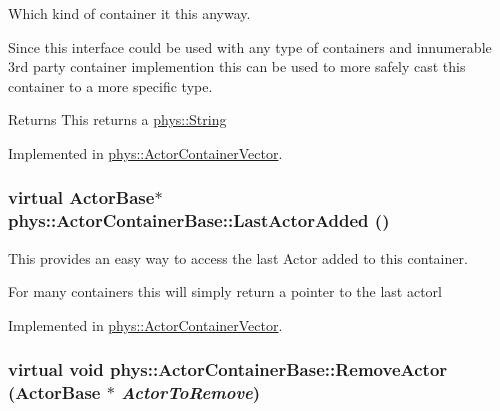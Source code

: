Which kind of container it this anyway. 

Since this interface could be used with any type of containers and innumerable 3rd party container implemention this can be used to more safely cast this container to a more specific type. \begin{DoxyReturn}{Returns}
This returns a \hyperlink{namespacephys_aa03900411993de7fbfec4789bc1d392e}{phys::String} 
\end{DoxyReturn}


Implemented in \hyperlink{classphys_1_1ActorContainerVector_a20d18213e69b3821ee973865df428e6d}{phys::ActorContainerVector}.

\hypertarget{classphys_1_1ActorContainerBase_a6ccc6d058bcbbe0b9a638e28fb136477}{
\subsubsection[{LastActorAdded}]{\setlength{\rightskip}{0pt plus 5cm}virtual {\bf ActorBase}$\ast$ phys::ActorContainerBase::LastActorAdded ()}}
\label{d1/d00/classphys_1_1ActorContainerBase_a6ccc6d058bcbbe0b9a638e28fb136477}


This provides an easy way to access the last Actor added to this container. 

For many containers this will simply return a pointer to the last actorl 

Implemented in \hyperlink{classphys_1_1ActorContainerVector_a49e643bdeff78521de9c4a9fea59a0d2}{phys::ActorContainerVector}.

\hypertarget{classphys_1_1ActorContainerBase_a523072e42f6b581d044432f84a84ede4}{
\subsubsection[{RemoveActor}]{\setlength{\rightskip}{0pt plus 5cm}virtual void phys::ActorContainerBase::RemoveActor ({\bf ActorBase} $\ast$ {\em ActorToRemove})}}
\label{d1/d00/classphys_1_1ActorContainerBase_a523072e42f6b581d044432f84a84ede4}


